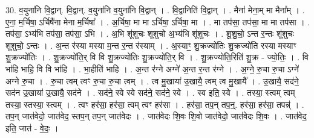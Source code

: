 \documentclass[17pt]{extarticle}
\begin{document}
30. व॒युना॑नि वि॒द्वान्. वि॒द्वान्. व॒युना॑नि व॒युना॑नि वि॒द्वान् । . वि॒द्वानिति॑ वि॒द्वान् । . मैना॑ मेना॒म् मा मैना᳚म् । . ए॒ना॒ म॒र्चिषा॒ ऽर्चिषै॑ना मेना म॒र्चिषा᳚ । . अ॒र्चिषा॒ मा मा ऽर्चिषा॒ ऽर्चिषा॒ मा । . मा तप॑सा॒ तप॑सा॒ मा मा तप॑सा । . तप॑सा॒ ऽभ्य॑भि तप॑सा॒ तप॑सा॒ ऽभि । . अ॒भि शू॑शुचः शूशुचो अ॒भ्य॑भि शू॑शुचः । . शू॒शु॒चो॒ ऽन्त र॒न्तः शू॑शुचः शूशुचो॒ ऽन्तः । . अ॒न्त र॑स्या मस्या म॒न्त र॒न्त र॑स्याम् । . अ॒स्याꣳ॒॒ शु॒क्रज्यो॑तिः शु॒क्रज्यो॑ति रस्या मस्याꣳ शु॒क्रज्यो॑तिः । . शु॒क्रज्यो॑ति॒र् वि वि शु॒क्रज्यो॑तिः शु॒क्रज्यो॑ति॒र् वि । . शु॒क्रज्यो॑ति॒रिति॑ शु॒क्र - ज्यो॒तिः॒ । . वि भा॑हि भाहि॒ वि वि भा॑हि । . भा॒हीति॑ भाहि । . अ॒न्त र॑ग्ने अग्ने॑ अ॒न्त र॒न्त र॑ग्ने । . अ॒ग्ने॒ रु॒चा रु॒चा ऽग्ने॑ अग्ने रु॒चा । . रु॒चा त्वम् त्वꣳ रु॒चा रु॒चा त्वम् । . त्व मु॒खाया॑ उ॒खायै॒ त्वम् त्व मु॒खायै᳚ । . उ॒खायै॒ सद॑ने॒ सद॑न उ॒खाया॑ उ॒खायै॒ सद॑ने । . सद॑ने॒ स्वे स्वे सद॑ने॒ सद॑ने॒ स्वे । . स्व इति॒ स्वे । . तस्या॒ स्त्वम् त्वम् तस्या॒ स्तस्या॒ स्त्वम् । . त्वꣳ हर॑सा॒ हर॑सा॒ त्वम् त्वꣳ हर॑सा । . हर॑सा॒ तप॒न् तप॒न्॒. हर॑सा॒ हर॑सा॒ तपन्न्॑ । . तप॒न् जात॑वेदो॒ जात॑वेद॒ स्तप॒न् तप॒न् जात॑वेदः । . जात॑वेदः शि॒वः शि॒वो जात॑वेदो॒ जात॑वेदः शि॒वः । . जात॑वेद॒ इति॒ जात॑ - वे॒दः॒ । \newline
\end{document}
